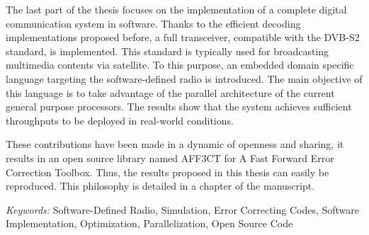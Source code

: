 The last part of the thesis focuses on the implementation of a complete digital
communication system in software. Thanks to the efficient decoding
implementations proposed before, a full transceiver, compatible with the DVB-S2
standard, is implemented. This standard is typically used for broadcasting
multimedia contents via satellite. To this purpose, an embedded domain specific
language targeting the software-defined radio is introduced. The main objective
of this language is to take advantage of the parallel architecture of the
current general purpose processors. The results show that the system achieves
sufficient throughputs to be deployed in real-world conditions.

These contributions have been made in a dynamic of openness and sharing, it
results in an open source library named AFF3CT for A Fast Forward Error
Correction Toolbox. Thus, the results proposed in this thesis can easily be
reproduced. This philosophy is detailed in a chapter of the manuscript.

\vskip0.5cm
\emph{Keywords:} Software-Defined Radio, Simulation, Error Correcting Codes,
                 Software Implementation, Optimization, Parallelization,
                 Open Source Code
